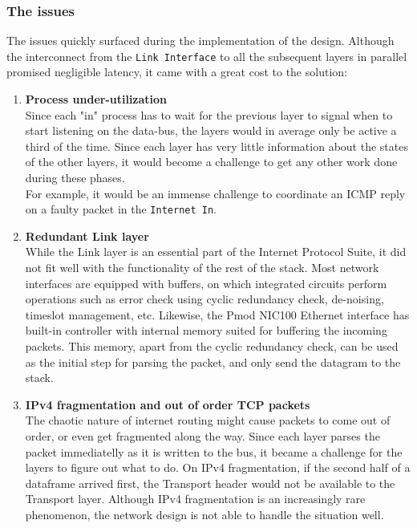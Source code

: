 \subsubsection{The issues}
The issues quickly surfaced during the implementation of the design. Although 
the interconnect from the \texttt{Link Interface} to all the subsequent layers
in parallel promised negligible latency, it came with a great cost to the solution:
\begin{enumerate}

\item \textbf{Process under-utilization} \label{item:process_utilization}\\
Since each "in" process has to wait for the previous layer to signal when to 
start listening on the data-bus, the layers would in average only be active a third
of the time. Since each layer has very little information about the states of 
the other layers, it would become a challenge to get any other work done during
these phases.\\
For example, it would be an immense challenge to coordinate an ICMP reply on a 
faulty packet in the \texttt{Internet In}.

\item \textbf{Redundant Link layer}\\
While the Link layer is an essential part of the Internet Protocol Suite, it did 
not fit well with the functionality of the rest of the stack. 
Most network interfaces are equipped with buffers, on which integrated circuits
perform operations such as error check using cyclic redundancy check, de-noising,
timeslot management, etc. 
Likewise, the Pmod NIC100 Ethernet interface has built-in controller with 
internal memory suited for buffering the incoming packets\cite{microchip_enc424j600}.
This memory, apart from the cyclic redundancy check, can be used as the initial
step for parsing the packet, and only send the datagram to the stack.


\item \textbf{IPv4 fragmentation and out of order TCP packets}\\
The chaotic nature of internet routing might cause packets to come out of order,
or even get fragmented along the way. Since each layer parses the packet immediatelly
as it is written to the bus, it became a challenge for the layers to figure out 
what to do. On IPv4 fragmentation, if the second half of a dataframe arrived 
first, the Transport header would not be available to the Transport layer. 
Although IPv4 fragmentation is an increasingly rare phenomenon, the network 
design is not able to handle the situation well.  



\end{enumerate}
